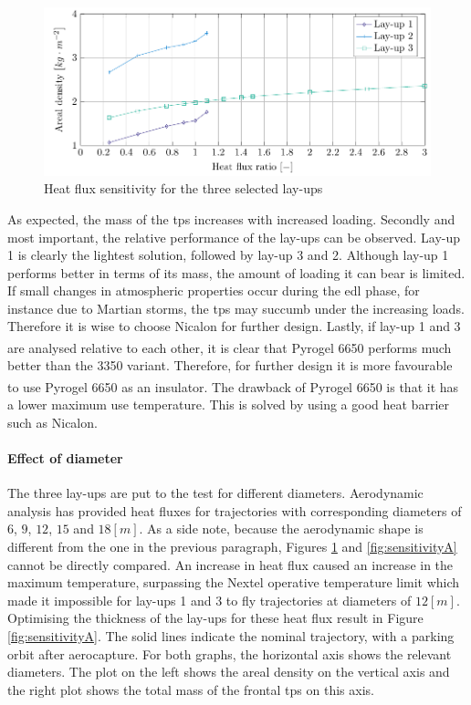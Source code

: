 \begin{figure}[h]
	\centering
	\includegraphics{./Figure/Thermal/Sensitivityq.pdf}
	\caption{Heat flux sensitivity for the three selected lay-ups}
	\label{fig:sensitivityq}
\end{figure}


As expected, the mass of the \gls{tps} increases with increased loading. Secondly and most important, the relative performance of the lay-ups can be observed. Lay-up 1 is clearly the lightest solution, followed by lay-up 3 and 2. Although lay-up 1 performs better in terms of its mass, the amount of loading it can bear is limited. If small changes in atmospheric properties occur during the \gls{edl} phase, for instance due to Martian storms, the \gls{tps} may succumb under the increasing loads. Therefore it is wise to choose Nicalon for further design. Lastly, if lay-up 1 and 3 are analysed relative to each other, it is clear that Pyrogel\textsuperscript{\textregistered} 6650 performs much better than the 3350 variant. Therefore, for further design it is more favourable to use Pyrogel\textsuperscript{\textregistered} 6650 as an insulator. The drawback of Pyrogel 6650 is that it has a lower maximum use temperature. This is solved by using a good heat barrier such as Nicalon.

\paragraph{Effect of diameter}
The three lay-ups are put to the test for different diameters. Aerodynamic analysis has provided heat fluxes for trajectories with corresponding diameters of $6$, $9$, $12$, $15$ and $18 \left[ m \right]$. As a side note, because the aerodynamic shape is different from the one in the previous paragraph, Figures \ref{fig:sensitivityq} and \ref{fig:sensitivityA} cannot be directly compared. An increase in heat flux caused an increase in the maximum temperature, surpassing the Nextel operative temperature limit which made it impossible for lay-ups 1 and 3 to fly trajectories at diameters of $12 \left[ m \right]$. Optimising the thickness of the lay-ups for these heat flux result in Figure \ref{fig:sensitivityA}. The solid lines indicate the nominal trajectory, with a parking orbit after aerocapture. For both graphs, the horizontal axis shows the relevant diameters. The plot on the left shows the areal density on the vertical axis and the right plot shows the total mass of the frontal \gls{tps} on this axis.

